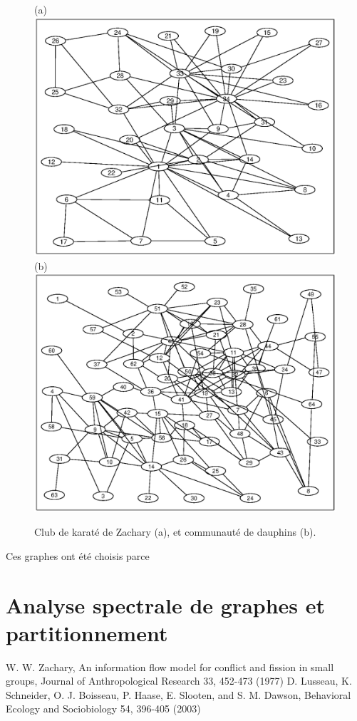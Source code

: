 \documentclass[12pt]{article}
\begin{document}
\begin{figure}[htb]
\centering
(a)
\includegraphics[width=.4 \textwidth]{zachary}
(b)
\includegraphics[width=.4 \textwidth]{dolphins}
\caption{Club de karaté de Zachary (a), et communauté de dauphins (b).}
\label{graphes}
\end{figure}

Ces graphes ont été choisis parce 
\section{Analyse spectrale de graphes et partitionnement}

\begin{thebibliography}{2}
 W. W. Zachary, An information flow model for conflict and fission in small groups, Journal of Anthropological Research 33, 452-473 (1977)
 D. Lusseau, K. Schneider, O. J. Boisseau, P. Haase, E. Slooten, and S. M. Dawson, Behavioral Ecology and Sociobiology 54, 396-405 (2003)
\end{thebibliography}
\end{document}
